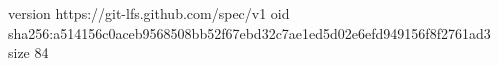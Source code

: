 version https://git-lfs.github.com/spec/v1
oid sha256:a514156c0aceb9568508bb52f67ebd32c7ae1ed5d02e6efd949156f8f2761ad3
size 84
